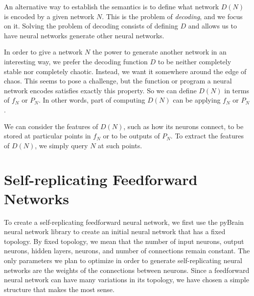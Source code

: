 \documentclass[12pt]{article}
\newcommand{\term}[1]{\emph{#1}}
\begin{document}
An alternative way to establish the semantics
is to define what network $D(N)$ is encoded
by a given network $N$.
This is the problem of \term{decoding},
and we focus on it.
Solving the problem of decoding
consists of defining $D$
and allows us to have neural networks
generate other neural networks.

In order to give a network $N$
the power to generate another network
in an interesting way,
we prefer the decoding function $D$
to be neither completely stable
nor completely chaotic.
Instead, we want it somewhere around the edge of chaos.%
\cite{langton1990edgechaos}%
\cite{bertschinger2004edgechaos}
This seems to pose a challenge,
but the function or program a neural network encodes
satisfies exactly this property.
So we can define $D(N)$ in terms of $f_N$ or $P_N$.
In other words, part of computing $D(N)$
can be applying $f_N$ or $P_N$.

We can consider the features of $D(N)$,
such as how its neurons connect,
to be stored at particular points
in $f_N$
or to be outputs of $P_N$.
To extract the features of $D(N)$,
we simply query $N$ at such points.



\section{Self-replicating Feedforward Networks}
\label{feedforward}

To create a self-replicating feedforward neural network,
we first use the pyBrain neural network library \cite{schaul2010}
to create an initial neural network that has a fixed topology.
By fixed topology, we mean that
the number of input neurons,
output neurons,
hidden layers,
neurons, and number of connections remain constant.
The only parameters we plan to optimize
in order to generate self-replicating neural networks
are the weights of the connections between neurons.
Since a feedforward neural network
can have many variations in its topology,
we have chosen a simple structure that makes the most sense.
\end{document}
